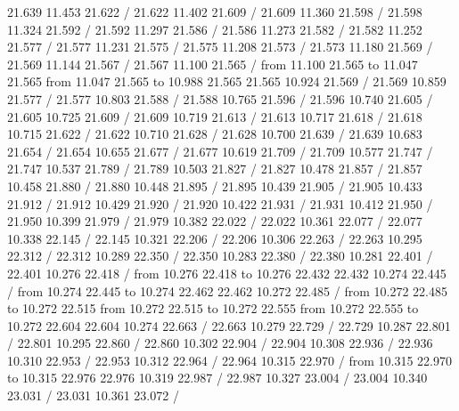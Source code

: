 {{ 21.639 11.453 21.622 /
 21.622 11.402 21.609 /
 21.609 11.360 21.598 /
 21.598 11.324 21.592 /
 21.592 11.297 21.586 /
 21.586 11.273 21.582 /
 21.582 11.252 21.577 /
 21.577 11.231 21.575 /
 21.575 11.208 21.573 /
 21.573 11.180 21.569 /
 21.569 11.144 21.567 /
 21.567 11.100 21.565 /
\putrule from 11.100 21.565 to 11.047 21.565
\putrule from 11.047 21.565 to 10.988 21.565
 21.565 10.924 21.569 /
 21.569 10.859 21.577 /
 21.577 10.803 21.588 /
 21.588 10.765 21.596 /
 21.596 10.740 21.605 /
 21.605 10.725 21.609 /
 21.609 10.719 21.613 /
 21.613 10.717 21.618 /
 21.618 10.715 21.622 /
 21.622 10.710 21.628 /
 21.628 10.700 21.639 /
 21.639 10.683 21.654 /
 21.654 10.655 21.677 /
 21.677 10.619 21.709 /
 21.709 10.577 21.747 /
 21.747 10.537 21.789 /
 21.789 10.503 21.827 /
 21.827 10.478 21.857 /
 21.857 10.458 21.880 /
 21.880 10.448 21.895 /
 21.895 10.439 21.905 /
 21.905 10.433 21.912 /
 21.912 10.429 21.920 /
 21.920 10.422 21.931 /
 21.931 10.412 21.950 /
 21.950 10.399 21.979 /
 21.979 10.382 22.022 /
 22.022 10.361 22.077 /
 22.077 10.338 22.145 /
 22.145 10.321 22.206 /
 22.206 10.306 22.263 /
 22.263 10.295 22.312 /
 22.312 10.289 22.350 /
 22.350 10.283 22.380 /
 22.380 10.281 22.401 /
 22.401 10.276 22.418 /
\putrule from 10.276 22.418 to 10.276 22.432
 22.432 10.274 22.445 /
\putrule from 10.274 22.445 to 10.274 22.462
 22.462 10.272 22.485 /
\putrule from 10.272 22.485 to 10.272 22.515
\putrule from 10.272 22.515 to 10.272 22.555
\putrule from 10.272 22.555 to 10.272 22.604
 22.604 10.274 22.663 /
 22.663 10.279 22.729 /
 22.729 10.287 22.801 /
 22.801 10.295 22.860 /
 22.860 10.302 22.904 /
 22.904 10.308 22.936 /
 22.936 10.310 22.953 /
 22.953 10.312 22.964 /
 22.964 10.315 22.970 /
\putrule from 10.315 22.970 to 10.315 22.976
 22.976 10.319 22.987 /
 22.987 10.327 23.004 /
 23.004 10.340 23.031 /
 23.031 10.361 23.072 /
}}
